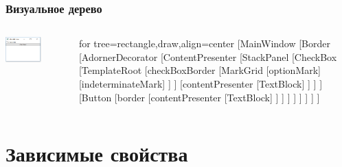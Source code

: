 \documentclass[xetex,mathserif,serif]{beamer}
\begin{document}
	\begin{frame}
		\frametitle{Визуальное дерево}
		\begin{columns}
			\begin{column}{0.4\textwidth}
				\begin{center}
					\includegraphics[width=0.6\textwidth]{wpfApp.png}
				\end{center}
			\end{column}
			\begin{column}{0.6\textwidth}
				\begin{tiny}
					\begin{forest}
						for tree={rectangle,draw,align=center}
						[MainWindow
							[Border
								[AdornerDecorator
									[ContentPresenter
										[StackPanel
											[CheckBox
												[TemplateRoot
													[checkBoxBorder
														[MarkGrid
															[optionMark]
															[indeterminateMark]
														]
													]
													[contentPresenter
														[TextBlock]
													]
												]
											]
											[Button
												[border
													[contentPresenter
														[TextBlock]
													]
												]
											]
										]
									]
								]
							]
						]
					\end{forest}
				\end{tiny}
			\end{column}
		\end{columns}
	\end{frame}

	\section{Зависимые свойства}
\end{document}
